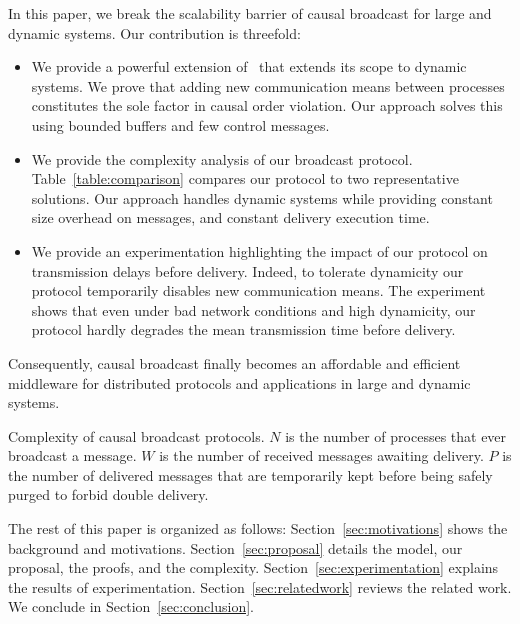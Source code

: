 In this paper, we break the scalability barrier of causal broadcast for large
and dynamic systems.  Our contribution is threefold:
\begin{itemize}%
\item We provide a powerful extension of~\cite{friedman2004causal} that extends
  its scope to dynamic systems. We prove that adding new communication means
  between processes constitutes the sole factor in causal order violation. Our
  approach solves this using bounded buffers and few control messages.
\item We provide the complexity analysis of our broadcast
  protocol. Table~\ref{table:comparison} compares our protocol to two
  representative solutions. Our approach handles dynamic systems while providing
  constant size overhead on messages, and constant delivery execution time.
\item We provide an experimentation highlighting the impact of our protocol on
  transmission delays before delivery. Indeed, to tolerate dynamicity our
  protocol temporarily disables new communication means.  The experiment shows
  that even under bad network conditions and high dynamicity, our protocol
  hardly degrades the mean transmission time before delivery.
\end{itemize}
Consequently, causal broadcast finally becomes an affordable and efficient
middleware for distributed protocols and applications in large and dynamic
systems.

\begin{table*}
  \begin{center}
  \caption{\label{table:comparison} Complexity of causal
    broadcast protocols. 
    $N$ is the number of processes that ever broadcast a message.
    $W$ is the number of received messages awaiting delivery.
    $P$ is the number of delivered messages that are temporarily kept before 
    being safely purged to forbid double delivery.}
  
  \end{center}
\end{table*}

The rest of this paper is organized as follows: Section~\ref{sec:motivations}
shows the background and motivations. Section~\ref{sec:proposal} details the
model, our proposal, the proofs, and the
complexity. Section~\ref{sec:experimentation} explains the results of
experimentation.  Section~\ref{sec:relatedwork} reviews the related work. We
conclude in Section~\ref{sec:conclusion}.

